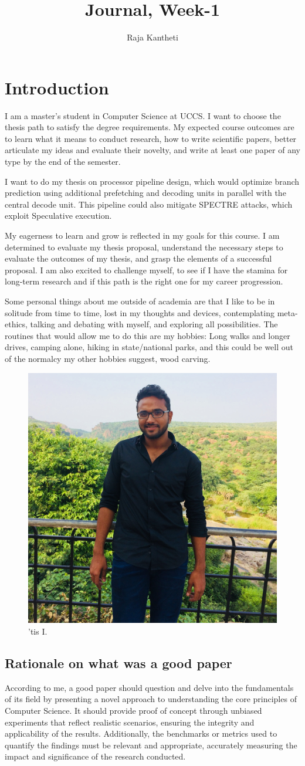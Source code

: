 \documentclass{article}
\title{Journal, Week-1}
\author{Raja Kantheti}
\begin{document}
\maketitle

\section{Introduction}
I am a master's student in Computer Science at UCCS. I want to choose the thesis path to satisfy the degree requirements. My expected course outcomes are to learn what it means to conduct research, how to write scientific papers, better articulate my ideas and evaluate their novelty, and write at least one paper of any type by the end of the semester.

I want to do my thesis on processor pipeline design, which would optimize branch prediction using additional prefetching and decoding units in parallel with the central decode unit. This pipeline could also mitigate SPECTRE attacks, which exploit Speculative execution. 

My eagerness to learn and grow is reflected in my goals for this course. I am determined to evaluate my thesis proposal, understand the necessary steps to evaluate the outcomes of my thesis, and grasp the elements of a successful proposal. I am also excited to challenge myself, to see if I have the stamina for long-term research and if this path is the right one for my career progression.

Some personal things about me outside of academia are that I like to be in solitude from time to time, lost in my thoughts and devices, contemplating meta-ethics, talking and debating with myself, and exploring all possibilities. The routines that would allow me to do this are my hobbies: Long walks and longer drives, camping alone, hiking in state/national parks, and this could be well out of the normalcy my other hobbies suggest, wood carving. 
\begin{figure}[h]
\centering
\includegraphics[width=0.25\linewidth]{IMG_1667.JPG}
\caption{'tis I. }
\end{figure}
\subsection[short]{Rationale on what was a good paper}
According to me, a good paper should question and delve into the fundamentals of its field by presenting a novel approach to understanding the core principles of Computer Science. It should provide proof of concept through unbiased experiments that reflect realistic scenarios, ensuring the integrity and applicability of the results. Additionally, the benchmarks or metrics used to quantify the findings must be relevant and appropriate, accurately measuring the impact and significance of the research conducted. 
\end{document}
